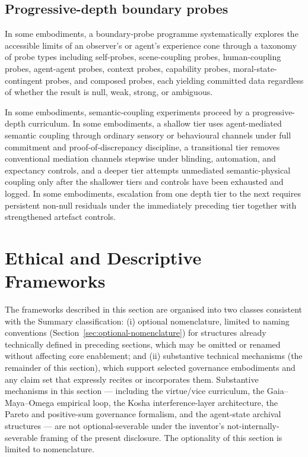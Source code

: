 \documentclass[a4paper,12pt]{article}
\begin{document}
\subsection{Progressive-depth boundary probes}


In some embodiments, a boundary-probe programme systematically
explores the accessible limits of an observer's or agent's experience
cone through a taxonomy of probe types including self-probes,
scene-coupling probes, human-coupling probes, agent-agent probes,
context probes, capability probes, moral-state-contingent probes, and
composed probes, each yielding committed data regardless of whether
the result is null, weak, strong, or ambiguous.

In some embodiments, semantic-coupling experiments proceed by a
progressive-depth curriculum. In some embodiments, a shallow tier uses
agent-mediated semantic coupling through ordinary sensory or
behavioural channels under full commitment and proof-of-discrepancy
discipline, a transitional tier removes conventional mediation
channels stepwise under blinding, automation, and expectancy controls,
and a deeper tier attempts unmediated semantic-physical coupling only
after the shallower tiers and controls have been exhausted and logged.
In some embodiments, escalation from one depth tier to the next
requires persistent non-null residuals under the immediately preceding
tier together with strengthened artefact controls.

\section{Ethical and Descriptive Frameworks}
\label{sec:ethical-frameworks}


The frameworks described in this section are organised into two
classes consistent with the Summary classification:
(i) optional nomenclature, limited to naming conventions
(Section~\ref{sec:optional-nomenclature}) for structures already
technically defined in preceding sections, which may be omitted or
renamed without affecting core enablement; and
(ii) substantive technical mechanisms (the remainder of this
section), which support selected governance embodiments and any
claim set that expressly recites or incorporates them. Substantive
mechanisms in this section --- including the virtue/vice curriculum,
the Gaia--Maya--Omega empirical loop, the Kosha interference-layer
architecture, the Pareto and positive-sum governance formalism, and
the agent-state archival structures --- are not optional-severable
under the inventor's not-internally-severable framing of the present
disclosure. The optionality of this section is limited to
nomenclature.
\end{document}
